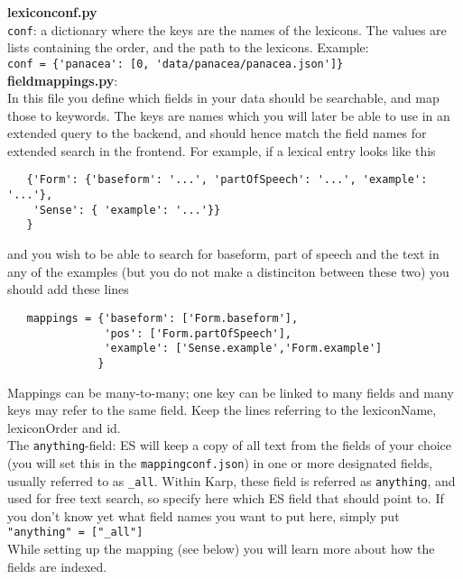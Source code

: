 \documentclass[
12pt, %
a4paper, %
oneside, %
headinclude,footinclude, %
BCOR0mm, %
]{scrartcl}
\begin{document}
\textbf{lexiconconf.py}\\
  \verb|conf|: a dictionary where the keys are the names of the lexicons.
        The values are lists containing the order, and the path to the lexicons.
    Example:\\
    \verb|conf = {'panacea': [0, 'data/panacea/panacea.json']}|\\

\textbf{fieldmappings.py}:\\
   In this file you define which fields in your data should be searchable,
   and map those to keywords. The keys are names which you will later be
   able to use in an extended query to the backend, and should hence match the
   field names for extended search in the frontend.
   For example, if a lexical entry looks like this
   \begin{verbatim}
   {'Form': {'baseform': '...', 'partOfSpeech': '...', 'example': '...'},
    'Sense': { 'example': '...'}}
   }
   \end{verbatim}
   and you wish to be able to search for baseform, part of speech and the text
   in any of the examples (but you do not make a distinciton between these two)
   you should add these lines
   \begin{verbatim}
   mappings = {'baseform': ['Form.baseform'],
               'pos': ['Form.partOfSpeech'],
               'example': ['Sense.example','Form.example']
              }
   \end{verbatim}
   Mappings can be many-to-many; one key can be linked to many fields and many keys may refer
   to the same field.
   Keep the lines referring to the lexiconName, lexiconOrder and id.\\
   The \verb|anything|-field:
   ES will keep a copy of all text from the fields of your choice
   (you will set this in the \verb|mappingconf.json|)   in one or more
   designated fields, usually referred to as \verb|_all|.
   Within Karp, these field is referred as \verb|anything|, and used for free
   text search, so specify here which ES field that should point to.
   If you don't know yet what field names you want to put here, simply put\\
   \verb|"anything" = ["_all"]|\\

   While setting up the mapping (see below) you will learn more about how the fields are indexed.\\

%
\end{document}
